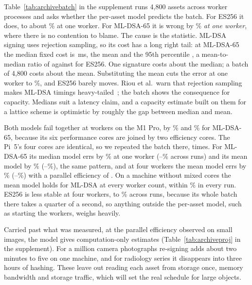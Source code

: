 Table~\ref{tab:archivebatch} in the supplement runs 4,800 assets across worker processes and
asks whether the per-asset model predicts the batch. For ES256 it does, to about \NarchErrOneES\% at one worker. For ML-DSA-65 it is wrong by
\NarchErrOneDSAsixtyfive\% \emph{at one worker}, where there is no contention
to blame. The cause is the statistic. ML-DSA signing uses rejection sampling,
so its cost has a long right tail: at ML-DSA-65 the median fixed cost is
\NarchFixMed\,ms, the mean \NarchFixMean{} and the 95th percentile
\NarchFixPnf, a mean-to-median ratio of \NarchTail{} against \NarchTailES{} for
ES256. One signature costs about the median; a batch of 4,800 costs about the
mean. Substituting the mean cuts the error at one worker to
\NarchErrMeanOneDSAsixtyfive\%, and ES256 barely moves. Riou et al.\ warn that
rejection sampling makes ML-DSA timings heavy-tailed~\cite{riou2026}; the
batch shows the consequence for capacity. Medians suit a latency claim, and a
capacity estimate built on them for a lattice scheme is optimistic by roughly
the gap between median and mean.

Both models fail together at \NarchMaxWorkers{} workers on the M1 Pro, by \NarchErrMaxDSAsixtyfive\% and \NarchErrMeanMaxDSAsixtyfive\% for ML-DSA-65, because its six performance cores
are joined by two efficiency cores. The Pi~5's four cores are identical, so we repeated the batch there, \NarchPiRuns{} times. For ML-DSA-65 its median model errs by \NarchPiErrOneDSAsixtyfive\% at one worker (\NarchPiErrOneDSAsixtyfiveLo--\NarchPiErrOneDSAsixtyfiveHi\% across runs) and its mean model by \NarchPiErrMeanOneDSAsixtyfive\% (\NarchPiErrMeanOneDSAsixtyfiveLo--\NarchPiErrMeanOneDSAsixtyfiveHi\%), the same pattern, and at four workers the mean model errs by \NarchPiErrMeanMaxDSAsixtyfive\% (\NarchPiErrMeanMaxDSAsixtyfiveLo--\NarchPiErrMeanMaxDSAsixtyfiveHi\%) with a parallel efficiency of \NarchPiEffMaxDSAsixtyfive. On a machine without mixed cores the mean model holds for ML-DSA at every worker count, within \NarchPiErrMeanAllMaxDSAsixtyfive\% in every run. ES256 is less stable at four workers, \NarchPiErrMeanMaxESLo{} to \NarchPiErrMeanMaxESHi\% across runs, because its whole batch there takes a quarter of a second, so anything outside the per-asset model, such as starting the workers, weighs heavily.

Carried past what was measured, at the parallel efficiency observed on small
images, the model gives computation-only estimates (Table~\ref{tab:archiveproj}
in the supplement). For a million camera photographs re-signing adds about two
minutes to five on one machine, and for radiology series it disappears into
three hours of hashing. These leave out reading each asset from storage once,
memory bandwidth and storage traffic, which will set the real schedule for
large objects.
